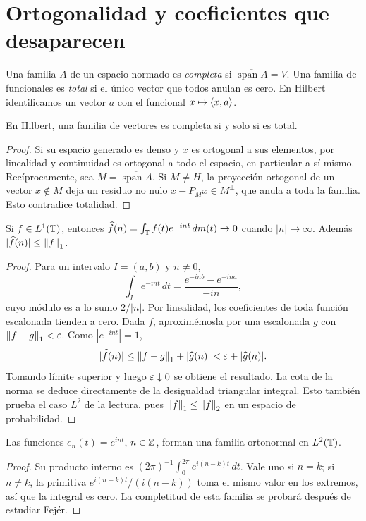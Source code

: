 \section{Ortogonalidad y coeficientes que desaparecen}
Una familia $A$ de un espacio normado es \emph{completa} si $\overline{\operatorname{span}A}=V$. Una familia de funcionales es \emph{total} si el único vector que todos anulan es cero. En Hilbert identificamos un vector $a$ con el funcional $x\mapsto\left\langle x,a\right\rangle$.
\begin{proposicion}
En Hilbert, una familia de vectores es completa si y solo si es total.
\end{proposicion}
\begin{proof}
Si su espacio generado es denso y $x$ es ortogonal a sus elementos, por linealidad y continuidad es ortogonal a todo el espacio, en particular a sí mismo. Recíprocamente, sea $M=\overline{\operatorname{span}A}$. Si $M\ne H$, la proyección ortogonal de un vector $x\notin M$ deja un residuo no nulo $x-P_Mx\in M^\perp$, que anula a toda la familia. Esto contradice totalidad.
\end{proof}
\begin{teorema}\label{v4:rl-circulo}
Si $f\in L^1(\mathbb T)$, entonces $\widehat f(n)=\int_\mathbb T f(t)e^{-int}\,dm(t)\to0$ cuando $|n|\to\infty$. Además $|\widehat f(n)|\leq\left\lVert f\right\rVert_1$.
\end{teorema}
\begin{proof}
Para un intervalo $I=(a,b)$ y $n\ne0$,
\[
 \int_I e^{-int}\,dt=\frac{e^{-inb}-e^{-ina}}{-in},
\]
cuyo módulo es a lo sumo $2/|n|$. Por linealidad, los coeficientes de toda función escalonada tienden a cero. Dada $f$, aproximémosla por una escalonada $g$ con $\left\lVert f-g\right\rVert_1<\varepsilon$. Como $|e^{-int}|=1$,
\[
 |\widehat f(n)|\leq\left\lVert f-g\right\rVert_1+|\widehat g(n)|<\varepsilon+|\widehat g(n)|.
\]
Tomando límite superior y luego $\varepsilon\downarrow0$ se obtiene el resultado. La cota de la norma se deduce directamente de la desigualdad triangular integral. Esto también prueba el caso $L^2$ de la lectura, pues $\left\lVert f\right\rVert_1\leq\left\lVert f\right\rVert_2$ en un espacio de probabilidad.
\end{proof}
\begin{proposicion}
Las funciones $e_n(t)=e^{int}$, $n\in\mathbb Z$, forman una familia ortonormal en $L^2(\mathbb T)$.
\end{proposicion}
\begin{proof}
Su producto interno es $(2\pi)^{-1}\int_0^{2\pi}e^{i(n-k)t}\,dt$. Vale uno si $n=k$; si $n\ne k$, la primitiva $e^{i(n-k)t}/(i(n-k))$ toma el mismo valor en los extremos, así que la integral es cero. La completitud de esta familia se probará después de estudiar Fejér.
\end{proof}

